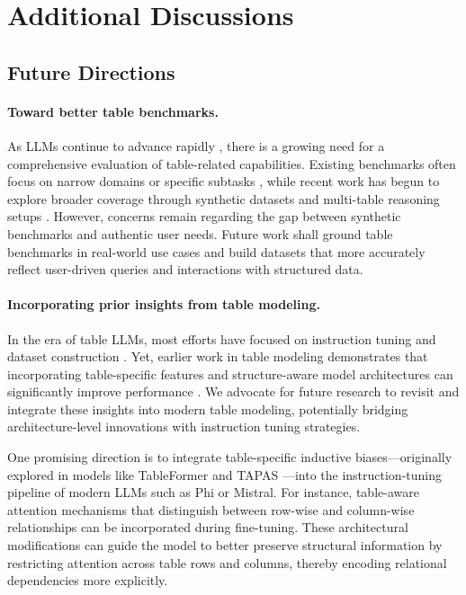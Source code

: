 \documentclass[11pt]{article}
\begin{document}
\section{Additional Discussions}
\label{appx-sec: additional-discussion}
\subsection{Future Directions}
\label{app-subsec: future-directions}

\paragraph{Toward better table benchmarks.}
As LLMs continue to advance rapidly \citep{ouyang2022training, touvron2023llama, dubey2024llama, yang2024qwen2}, there is a growing need for a comprehensive evaluation of table-related capabilities. 
Existing benchmarks often focus on narrow domains or specific subtasks \citep{Chen2020TabFact, nan-etal-2022-fetaqa}, while recent work has begun to explore broader coverage through synthetic datasets \citep{wu2025tablebench} and multi-table reasoning setups \citep{wu2025mmqa}. 
However, concerns remain regarding the gap between synthetic benchmarks and authentic user needs. 
Future work shall ground table benchmarks in real-world use cases and build datasets that more accurately reflect user-driven queries and interactions with structured data.


\paragraph{Incorporating prior insights from table modeling.}
In the era of table LLMs, most efforts have focused on instruction tuning and dataset construction \citep{zhang-etal-2024-tablellama, zheng-etal-2024-multimodal}. 
Yet, earlier work in table modeling demonstrates that incorporating table-specific features and structure-aware model architectures can significantly improve performance \citep{herzig-etal-2020-tapas, yang-etal-2022-tableformer}.
We advocate for future research to revisit and integrate these insights into modern table modeling, potentially bridging architecture-level innovations with instruction tuning strategies.

One promising direction is to integrate table-specific inductive biases—originally explored in models like TableFormer \citep{yang-etal-2022-tableformer} and TAPAS \citep{herzig-etal-2020-tapas}—into the instruction-tuning pipeline of modern LLMs such as Phi or Mistral.
For instance, table-aware attention mechanisms that distinguish between row-wise and column-wise relationships \citep{yang-etal-2022-tableformer} can be incorporated during fine-tuning. 
These architectural modifications can guide the model to better preserve structural information by restricting attention across table rows and columns, thereby encoding relational dependencies more explicitly.
\end{document}
